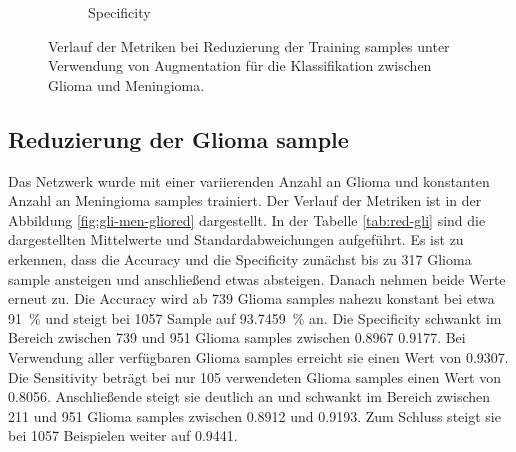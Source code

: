 \begin{figure}[H]
\begin{subfigure}[b]{0.48\textwidth}
    \caption{Specificity}
    \label{fig:augm-spec}
  \end{subfigure}
  \caption{Verlauf der Metriken bei Reduzierung der Training samples unter Verwendung von Augmentation für die Klassifikation zwischen Glioma und Meningioma.}
  \label{fig:gli-men-augm}
\end{figure}
\subsection{Reduzierung der Glioma sample}
Das Netzwerk wurde mit einer variierenden Anzahl an Glioma und konstanten Anzahl an Meningioma samples trainiert.
Der Verlauf der Metriken ist in der Abbildung \ref{fig:gli-men-gliored} dargestellt.
In der Tabelle \ref{tab:red-gli} sind die dargestellten Mittelwerte und Standardabweichungen aufgeführt. 
Es ist zu erkennen, dass die Accuracy und die Specificity zunächst bis zu 317 Glioma sample ansteigen und anschließend etwas absteigen.
Danach nehmen beide Werte erneut zu.
Die Accuracy wird ab 739 Glioma samples nahezu konstant bei etwa \SI{91}{\percent} und steigt bei 1057 Sample auf \SI{93.7459}{\percent} an.
Die Specificity schwankt im Bereich zwischen 739 und 951 Glioma samples zwischen \SI{0.8967}{} \SI{0.9177}{}.
Bei Verwendung aller verfügbaren Glioma samples erreicht sie einen Wert von \SI{0.9307}{}.
Die Sensitivity beträgt bei nur 105 verwendeten Glioma samples einen Wert von \SI{0.8056}{}.
Anschließende steigt sie deutlich an und schwankt im Bereich zwischen 211 und 951 Glioma samples zwischen \SI{0.8912}{} und \SI{0.9193}{}. 
Zum Schluss steigt sie bei 1057 Beispielen weiter auf \SI{0.9441}{}.
